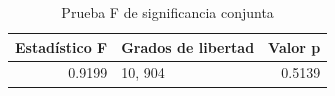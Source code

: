 
\begin{longtable}[t]{rlr}
\caption{Prueba F de significancia conjunta}\\
\toprule
Estadístico F & Grados de libertad & Valor p\\
\midrule
0.9199 & 10, 904 & 0.5139\\
\bottomrule
\end{longtable}
